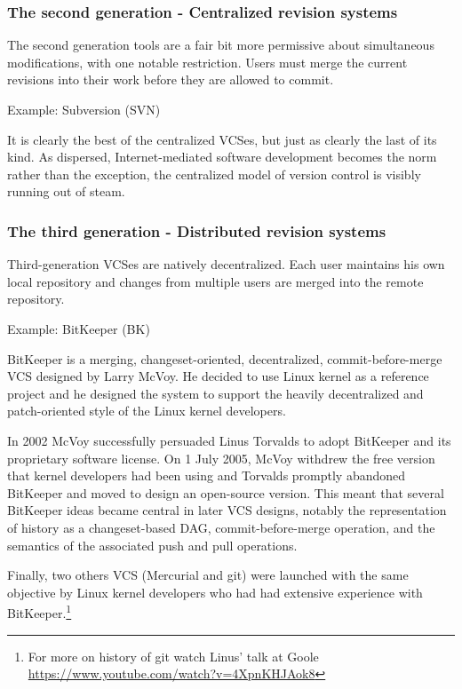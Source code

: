 \documentclass{article}
\begin{document}
\subsubsection*{The second generation - Centralized revision systems}

The second generation tools are a fair bit more permissive about
simultaneous modifications, with one notable restriction. Users must
merge the current revisions into their work before they are allowed to
commit. 

Example: Subversion (SVN)

It is clearly the best of the centralized VCSes, but just as clearly
the last of its kind. As dispersed, Internet-mediated software
development becomes the norm rather than the exception, the
centralized model of version control is visibly running out of steam.

\subsubsection*{The third generation - Distributed revision systems}

Third-generation VCSes are natively decentralized. Each user maintains
his own local repository and changes from multiple users are merged 
into the remote repository.

Example: BitKeeper (BK)

BitKeeper is a merging, changeset-oriented, decentralized,
commit-before-merge VCS designed by Larry McVoy.
He decided to use Linux kernel as a reference project and he designed
the system to support the heavily decentralized and patch-oriented
style of the Linux kernel developers.

In 2002 McVoy successfully persuaded Linus Torvalds to adopt BitKeeper
and its proprietary software license. On 1 July 2005,
McVoy withdrew the free version that kernel developers had
been using and Torvalds promptly abandoned BitKeeper and moved
to design an open-source version. This meant that several BitKeeper
ideas became central in later VCS designs, notably the
representation of history as a changeset-based DAG,
commit-before-merge operation, and the semantics of the associated
push and pull operations.

Finally, two others VCS (Mercurial and git) were launched with
the same objective by Linux kernel developers who had had extensive
experience with BitKeeper.\footnote{For more on history of git watch
  Linus' talk at Goole \url{https://www.youtube.com/watch?v=4XpnKHJAok8}}
\end{document}
